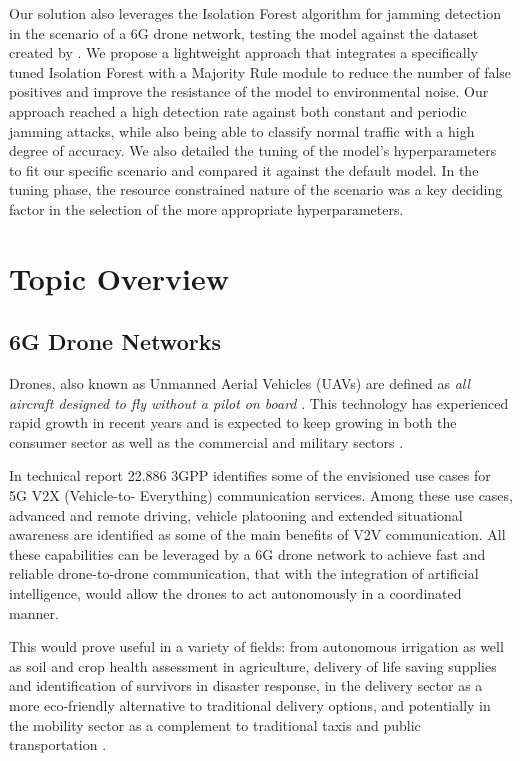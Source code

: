 \documentclass[futureinternet,article,submit,pdftex,moreauthors]{Definitions/mdpi}
\begin{document}
Our solution also leverages the Isolation Forest algorithm for jamming detection in the scenario of a 6G drone network, testing the model against the dataset created by \cite{JammingDetectionIoT-Hussain}.
We propose a lightweight approach that integrates a specifically tuned Isolation Forest with a Majority Rule module to reduce the number of false positives and improve the resistance of the model to environmental noise.
Our approach reached a high detection rate against both constant and periodic jamming attacks, while also being able to classify normal traffic with a high degree of accuracy. We also detailed the tuning of the model's hyperparameters to fit our specific scenario and compared it 
against the default model. In the tuning phase, the resource constrained nature of the scenario was a key deciding factor in the selection of the more appropriate hyperparameters.

\section{Topic Overview}

\subsection{6G Drone Networks}

Drones, also known as Unmanned Aerial Vehicles (UAVs) are defined as \textit{all aircraft designed to fly
without a pilot on board} \cite{DronesEC}. This technology has experienced rapid growth in recent years and is expected to 
keep growing in both the consumer sector as well as the commercial and military sectors \cite{DronesStatisticsLaricchia}.

In technical report 22.886 \cite{5GV2XSultan} 3GPP identifies some of the envisioned use cases for 5G V2X (Vehicle-to-
Everything) communication services. Among these use cases, advanced and remote driving, vehicle platooning and extended situational awareness are identified as some of the main benefits
of V2V communication. All these capabilities can be leveraged by a 6G drone network to achieve fast and reliable drone-to-drone communication, that with the integration of artificial intelligence, 
would allow the drones to act autonomously in a coordinated manner. 

This would prove useful in a variety of fields: from autonomous irrigation as well as soil and crop health assessment in agriculture, 
delivery of life saving supplies and identification of survivors in disaster response, in the delivery sector as a more eco-friendly alternative to traditional 
delivery options, and potentially in the mobility sector as a complement to traditional taxis and public transportation \cite{DroneCommHassija}. 
\end{document}
